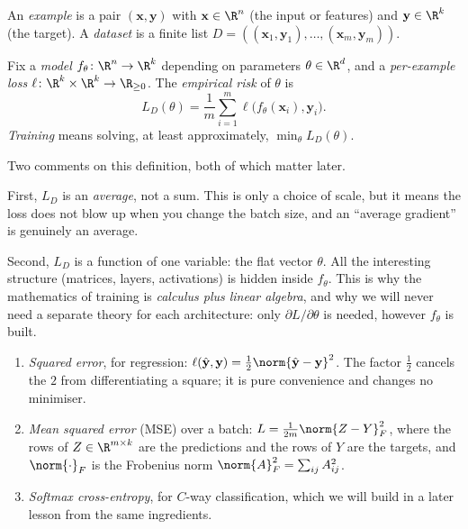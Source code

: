 \begin{definition}
An \emph{example} is a pair $(\mathbf{x}, \mathbf{y})$ with
$\mathbf{x}\in\R^{n}$ (the input or features) and $\mathbf{y}\in\R^{k}$
(the target). A \emph{dataset} is a finite list
$D=((\mathbf{x}_1,\mathbf{y}_1),\ldots,(\mathbf{x}_m,\mathbf{y}_m))$.

Fix a \emph{model} $f_\theta\colon\R^{n}\to\R^{k}$ depending on parameters
$\theta\in\R^{d}$, and a \emph{per-example loss}
$\ell\colon\R^{k}\times\R^{k}\to\R_{\ge 0}$. The \emph{empirical risk} of
$\theta$ is
\[
  L_D(\theta)=\frac{1}{m}\sum_{i=1}^{m}\ell\bigl(f_\theta(\mathbf{x}_i),\mathbf{y}_i\bigr).
\]
\emph{Training} means solving, at least approximately,
$\min_{\theta}L_D(\theta)$.
\end{definition}

Two comments on this definition, both of which matter later.

First, $L_D$ is an \emph{average}, not a sum. This is only a choice of scale,
but it means the loss does not blow up when you change the batch size, and an
``average gradient'' is genuinely an average.

Second, $L_D$ is a function of one variable: the flat vector $\theta$. All the
interesting structure (matrices, layers, activations) is hidden inside
$f_\theta$. This is why the mathematics of training is \emph{calculus plus
linear algebra}, and why we will never need a separate theory for each
architecture: only $\partial L/\partial\theta$ is needed, however $f_\theta$
is built.

\begin{example}
\leavevmode
\begin{enumerate}[label=(\alph*)]
  \item \emph{Squared error}, for regression: $\ell(\hat{\mathbf{y}},\mathbf{y})=\tfrac12\norm{\hat{\mathbf{y}}-\mathbf{y}}^2$.
    The factor $\tfrac12$ cancels the $2$ from differentiating a square; it is
    pure convenience and changes no minimiser.
  \item \emph{Mean squared error} (MSE) over a batch: $L=\frac{1}{2m}\norm{Z-Y}_F^2$,
    where the rows of $Z\in\R^{m\times k}$ are the predictions and the rows
    of $Y$ are the targets, and $\norm{\cdot}_F$ is the Frobenius norm
    $\norm{A}_F^2=\sum_{ij}A_{ij}^2$.
  \item \emph{Softmax cross-entropy}, for $C$-way classification, which we
    will build in a later lesson from the same ingredients.
\end{enumerate}
\end{example}


